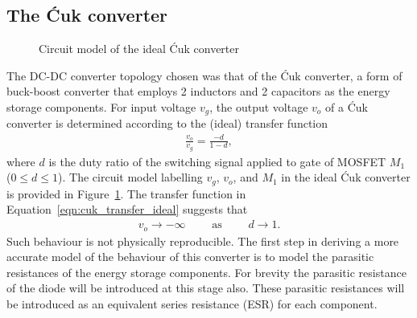 \subsection{The \'Cuk converter}
\begin{figure}[H]
\centering
{}
\caption{Circuit model of the ideal \'Cuk converter}
\label{cir:cuk_ideal}
\end{figure}
The DC-DC converter topology chosen was that of the \'Cuk converter, a form of buck-boost converter that employs 2 inductors and 2 capacitors as the energy storage components.
\newpar
For input voltage $v_g$, the output voltage $v_o$ of a \'Cuk converter is determined according to the (ideal) transfer function
\begin{align}\label{eqn:cuk_transfer_ideal}
\frac{v_o}{v_g} = \frac{\minus d}{1 - d},
\end{align}
where $d$ is the duty ratio of the switching signal applied to gate of MOSFET $M_1$ ($0 \leq d \leq 1$). The circuit model labelling $v_g$, $v_o$, and $M_1$ in the ideal \'Cuk converter is provided in Figure~\ref{cir:cuk_ideal}.
\newpar
The transfer function in Equation~\ref{eqn:cuk_transfer_ideal} suggests that
\begin{align*}
v_o \rightarrow \minus\infty \qquad\text{ as }\qquad d \rightarrow 1.
\end{align*}
Such behaviour is not physically reproducible. The first step in deriving a more accurate model of the behaviour of this converter is to model the parasitic resistances of the energy storage components. For brevity the parasitic resistance of the diode will be introduced at this stage also. These parasitic resistances will be introduced as an equivalent series resistance (ESR) for each component.
